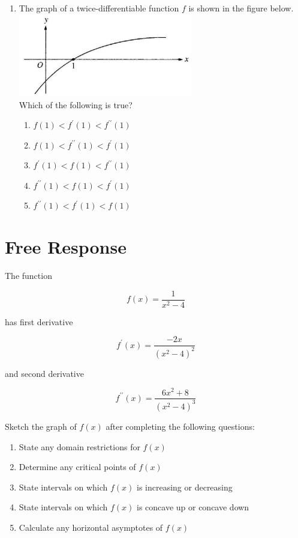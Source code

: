 \documentclass{article}
\begin{document}
\begin{enumerate}
\begin{minipage}[t]{\linewidth}
\begin{enumerate}
		\end{enumerate}
	\end{minipage}
	\item
	\begin{minipage}[t]{\linewidth}
		The graph of a twice-differentiable function \(f\) is shown in the
figure below.\\
\includegraphics[width=2.9833333333333334in]{media/d7b0a695-c4ff-5482-a58c-e1186654c6aa.jpg}\\
Which of the following is true?
\vspace{1em}
		\begin{enumerate}
		\itemsep1em
			\item \(f(1)<f^{\prime}(1)<f^{\prime \prime}(1)\)
			\item \(f(1)<f^{\prime \prime}(1)<f^{\prime}(1)\)
			\item \(f^{\prime}(1)<f(1)<f^{\prime \prime}(1)\)
			\item \(f^{\prime \prime}(1)<f(1)<f^{\prime}(1)\)
			\item \(f^{\prime \prime}(1)<f^{\prime}(1)<f(1)\)
		\end{enumerate}
	\end{minipage}
\end{enumerate}


\section{Free Response}

The function

$$
f(x)=\frac{1}{x^{2}-4}
$$

has first derivative

$$
f^{\prime}(x)=\frac{-2 x}{\left(x^{2}-4\right)^{2}}
$$

and second derivative

$$
f^{\prime \prime}(x)=\frac{6 x^{2}+8}{\left(x^{2}-4\right)^{3}}
$$

Sketch the graph of $f(x)$ after completing the following questions:

\begin{enumerate}
	\setlength{\itemsep}{1in}
	\item State any domain restrictions for $f(x)$
	\item Determine any critical points of $f(x)$
	\item State intervals on which $f(x)$ is increasing or decreasing
	\item State intervals on which $f(x)$ is concave up or concave down
	\item Calculate any horizontal asymptotes of $f(x)$
\end{enumerate}
\end{document}
